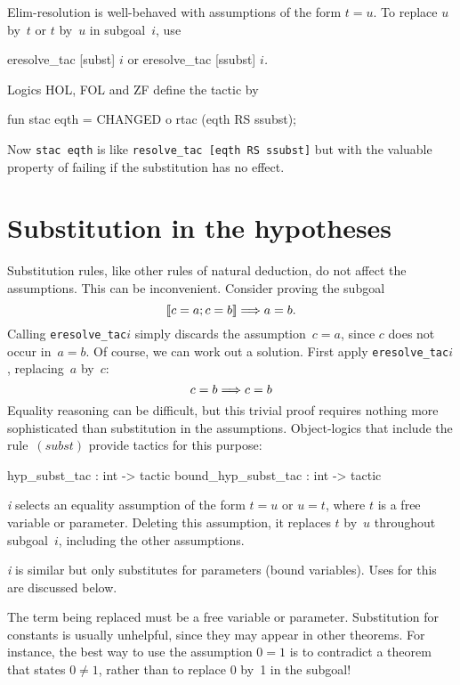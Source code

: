 Elim-resolution is well-behaved with assumptions of the form $t=u$.
To replace $u$ by~$t$ or $t$ by~$u$ in subgoal~$i$, use
\begin{ttbox} 
eresolve_tac [subst] \(i\)    {\rm or}    eresolve_tac [ssubst] \(i\){\it.}
\end{ttbox}

Logics HOL, FOL and ZF define the tactic  by
\begin{ttbox} 
fun stac eqth = CHANGED o rtac (eqth RS ssubst);
\end{ttbox}
Now \texttt{stac~eqth} is like \texttt{resolve_tac [eqth RS ssubst]} but with the
valuable property of failing if the substitution has no effect.


\section{Substitution in the hypotheses}
Substitution rules, like other rules of natural deduction, do not affect
the assumptions.  This can be inconvenient.  Consider proving the subgoal
\[ \mathopen{[\![} c=a; c=b\mathclose{]\!]} \Longrightarrow a=b. \]
Calling \texttt{eresolve_tac\ts[ssubst]\ts\(i\)} simply discards the
assumption~$c=a$, since $c$ does not occur in~$a=b$.  Of course, we can
work out a solution.  First apply \texttt{eresolve_tac\ts[subst]\ts\(i\)},
replacing~$a$ by~$c$:
\[ c=b \Longrightarrow c=b \]
Equality reasoning can be difficult, but this trivial proof requires
nothing more sophisticated than substitution in the assumptions.
Object-logics that include the rule~$(subst)$ provide tactics for this
purpose:
\begin{ttbox} 
hyp_subst_tac       : int -> tactic
bound_hyp_subst_tac : int -> tactic
\end{ttbox}
\begin{ttdescription}
\item[\ttindexbold{hyp_subst_tac} {\it i}] 
  selects an equality assumption of the form $t=u$ or $u=t$, where $t$ is a
  free variable or parameter.  Deleting this assumption, it replaces $t$
  by~$u$ throughout subgoal~$i$, including the other assumptions.

\item[\ttindexbold{bound_hyp_subst_tac} {\it i}] 
  is similar but only substitutes for parameters (bound variables).
  Uses for this are discussed below.
\end{ttdescription}
The term being replaced must be a free variable or parameter.  Substitution
for constants is usually unhelpful, since they may appear in other
theorems.  For instance, the best way to use the assumption $0=1$ is to
contradict a theorem that states $0\not=1$, rather than to replace 0 by~1
in the subgoal!

